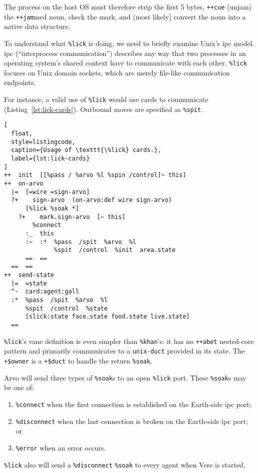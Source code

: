 \documentclass[twoside]{article}
\begin{document}
The process on the host OS must therefore strip the first 5 bytes, \lstinline[style=inlinecode]{++cue} (unjam) the \lstinline[style=inlinecode]{++jam}med noun, check the mark, and (most likely) convert the noun into a native data structure.

To understand what \texttt{\%lick} is doing, we need to briefly examine Unix's {\sc ipc} model.  {\sc ipc} (``interprocess communication'') describes any way that two processes in an operating system's shared context have to communicate with each other.  \texttt{\%lick} focuses on Unix domain sockets, which are merely file-like communication endpoints.

For instance, a valid use of \texttt{\%lick} would use cards to communicate (Listing~\ref{lst:lick-cards}).  Outbound moves are specified as \lstinline[style=inlinecode]{%spit}.

\begin{lstlisting}[
  float,
  style=listingcode,
  caption={Usage of \texttt{\%lick} cards.},
  label={lst:lick-cards}
]
++  init  [[%pass / %arvo %l %spin /control]~ this]
++  on-arvo
  |=  [=wire =sign-arvo]
  ?+    sign-arvo  (on-arvo:def wire sign-arvo)
      [%lick %soak *]
    ?+    mark.sign-arvo  [~ this]
        %connect
      :_  this
      :~  :*  %pass  /spit  %arvo  %l
              %spit  /control  %init  area.state
      ==  ==
  ==  ==
++  send-state
  |=  =state
  ^-  card:agent:gall
  :*  %pass  /spit  %arvo  %l 
      %spit  /control  %state
      [slick:state face.state food.state live.state]
  ==
\end{lstlisting}

\texttt{\%lick}'s vane definition is even simpler than \texttt{\%khan}'s:  it has no \texttt{++abet} nested-core pattern and primarily communicates to a \texttt{unix-duct} provided in its state.  The \lstinline[style=inlinecode]{+$owner} is a \lstinline[style=inlinecode]{+$duct} to handle the return \lstinline[style=inlinecode]{%soak}.

Arvo will send three types of \lstinline[style=inlinecode]{%soak}s to an open \texttt{\%lick} port.  These \lstinline[style=inlinecode]{%soak}s may be one of:

\begin{enumerate}
  \item  \lstinline[style=inlinecode]{%connect} when the first connection is established on the Earth-side {\sc ipc} port;
  \item  \lstinline[style=inlinecode]{%disconnect} when the last connection is broken on the Earth-side {\sc ipc} port; or
  \item  \lstinline[style=inlinecode]{%error} when an error occurs.
\end{enumerate}
\noindent
\texttt{\%lick} also will send a \lstinline[style=inlinecode]{%disconnect} \lstinline[style=inlinecode]{%soak} to every agent when Vere is started.
\end{document}
